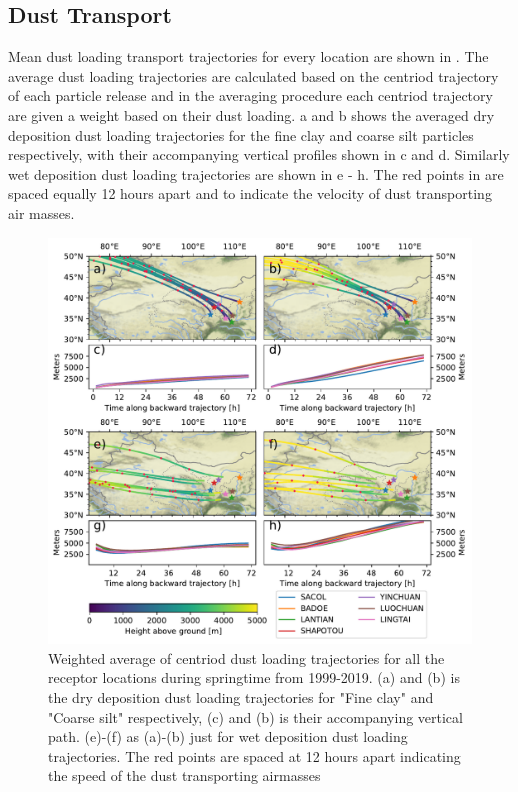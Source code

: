 \subsection{Dust Transport}
Mean dust loading transport trajectories for every location are shown in . The average dust loading trajectories are calculated based on the centriod trajectory of each particle release and in the averaging procedure each centriod trajectory are given a weight based on their dust loading.  a and b shows the averaged dry deposition dust loading trajectories for the fine clay and coarse silt particles respectively, with their accompanying vertical profiles shown in c and d. Similarly wet deposition dust loading trajectories are shown in e - h. The red points in  are spaced equally 12 hours apart and to indicate the velocity of dust transporting air masses. 
\begin{figure}[hptb]
    \centering
    \includegraphics[width=\textwidth]{texfiles/figs/average_dust_transport_trajectories.pdf}
    \caption{Weighted average of centriod dust loading trajectories for all the receptor locations during springtime from 1999-2019. (a) and (b) is the dry deposition dust loading trajectories for "Fine clay" and "Coarse silt" respectively, (c) and (b) is their accompanying vertical path.  (e)-(f) as (a)-(b) just for wet deposition dust loading trajectories. The red points are spaced at 12 hours apart indicating the speed of the dust transporting airmasses }
    \label{fig:dust_loading_trajecs}
\end{figure}

